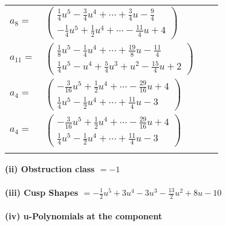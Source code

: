 \documentclass[1p]{elsarticle_modified}
\theoremstyle{definition}
\begin{document}
\begin{tabular}{m{7pt} m{180pt} m{7pt} m{180pt} }
\flushright $a_{8}=$&$\begin{pmatrix}\frac{1}{4} u^5-\frac{3}{4} u^4+\cdots+\frac{3}{4} u-\frac{9}{4}\\-\frac{1}{4} u^5+\frac{1}{2} u^4+\cdots-\frac{11}{4} u+4\end{pmatrix}$ \\
\flushright $a_{11}=$&$\begin{pmatrix}\frac{1}{8} u^5-\frac{1}{4} u^4+\cdots+\frac{19}{8} u-\frac{11}{4}\\\frac{1}{4} u^5- u^4+\frac{5}{4} u^3+u^2-\frac{15}{4} u+2\end{pmatrix}$ \\
\flushright $a_{4}=$&$\begin{pmatrix}-\frac{3}{16} u^5+\frac{1}{2} u^4+\cdots-\frac{29}{16} u+4\\\frac{1}{4} u^5-\frac{1}{2} u^4+\cdots+\frac{11}{4} u-3\end{pmatrix}$\\ \flushright $a_{4}=$&$\begin{pmatrix}-\frac{3}{16} u^5+\frac{1}{2} u^4+\cdots-\frac{29}{16} u+4\\\frac{1}{4} u^5-\frac{1}{2} u^4+\cdots+\frac{11}{4} u-3\end{pmatrix}$\\&\end{tabular}
\flushleft \textbf{(ii) Obstruction class $= -1$}\\~\\
\flushleft \textbf{(iii) Cusp Shapes $= -\frac{1}{2} u^5+3 u^4-3 u^3-\frac{13}{2} u^2+8 u-10$}\\~\\
\newpage\renewcommand{\arraystretch}{1}
\flushleft \textbf{(iv) u-Polynomials at the component}\newline \\
\end{document}
